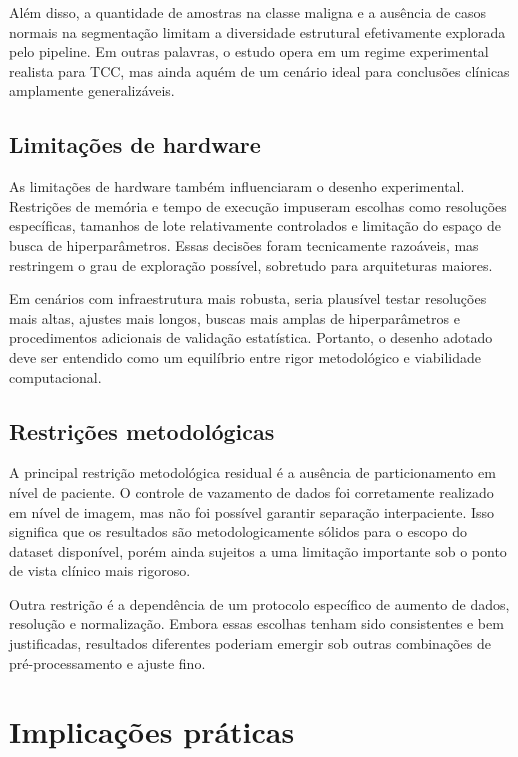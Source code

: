 \documentclass[tcc,capa]{texufpel}
\begin{document}
Além disso, a quantidade de amostras na classe maligna e a ausência de casos normais na segmentação limitam a diversidade estrutural efetivamente explorada pelo pipeline. Em outras palavras, o estudo opera em um regime experimental realista para TCC, mas ainda aquém de um cenário ideal para conclusões clínicas amplamente generalizáveis.

\subsection{Limitações de hardware}

As limitações de hardware também influenciaram o desenho experimental. Restrições de memória e tempo de execução impuseram escolhas como resoluções específicas, tamanhos de lote relativamente controlados e limitação do espaço de busca de hiperparâmetros. Essas decisões foram tecnicamente razoáveis, mas restringem o grau de exploração possível, sobretudo para arquiteturas maiores.

Em cenários com infraestrutura mais robusta, seria plausível testar resoluções mais altas, ajustes mais longos, buscas mais amplas de hiperparâmetros e procedimentos adicionais de validação estatística. Portanto, o desenho adotado deve ser entendido como um equilíbrio entre rigor metodológico e viabilidade computacional.

\subsection{Restrições metodológicas}

A principal restrição metodológica residual é a ausência de particionamento em nível de paciente. O controle de vazamento de dados foi corretamente realizado em nível de imagem, mas não foi possível garantir separação interpaciente. Isso significa que os resultados são metodologicamente sólidos para o escopo do dataset disponível, porém ainda sujeitos a uma limitação importante sob o ponto de vista clínico mais rigoroso.

Outra restrição é a dependência de um protocolo específico de aumento de dados, resolução e normalização. Embora essas escolhas tenham sido consistentes e bem justificadas, resultados diferentes poderiam emergir sob outras combinações de pré-processamento e ajuste fino.

\section{Implicações práticas}
\end{document}
